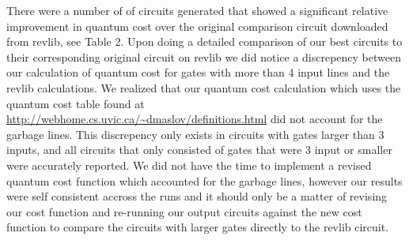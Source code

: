 There were a number of of circuits generated that showed a significant relative improvement in quantum cost over the original comparison 
circuit downloaded from revlib, see Table 2. Upon doing a detailed comparison of our best circuits to their corresponding original circuit on revlib we 
did notice a discrepency between our calculation of quantum cost for gates with more than 4 input lines and the revlib calculations. We 
realized that our quantum cost calculation which uses the quantum cost table found at \url{http://webhome.cs.uvic.ca/~dmaslov/definitions.html}
did not account for the garbage lines. This discrepency only exists in circuits with gates larger than 3 inputs, and all circuits that only consisted
of gates that were 3 input or smaller were accurately reported. We did not have the time to implement a revised quantum cost function which accounted 
for the garbage lines, however our results were self consistent accross the runs and it should only be a matter of revising our cost function and 
re-running our output circuits against the new cost function to compare the circuits with larger gates directly to the revlib circuit.


